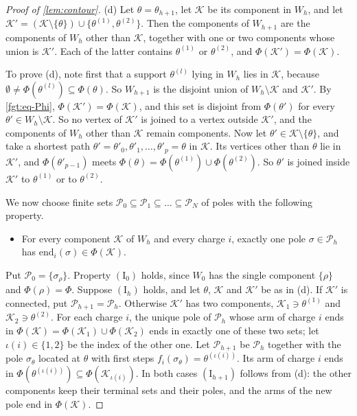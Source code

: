 \begin{proof}[Proof of \cref{lem:contour}]
(d) Let $\theta=\theta_{h+1}$, let $\mathcal K$ be its component in $W_h$, and let $\mathcal K'=(\mathcal K\setminus\{\theta\})\cup\{\theta^{(1)},\theta^{(2)}\}$. Then the components of $W_{h+1}$ are the components of $W_h$ other than $\mathcal K$, together with one or two components whose union is $\mathcal K'$. Each of the latter contains $\theta^{(1)}$ or $\theta^{(2)}$, and $\Phi(\mathcal K')=\Phi(\mathcal K)$.

To prove (d), note first that a support $\theta^{(l)}$ lying in $W_h$ lies in $\mathcal K$, because $\emptyset\ne\Phi(\theta^{(l)})\subseteq\Phi(\theta)$. So $W_{h+1}$ is the disjoint union of $W_h\setminus\mathcal K$ and $\mathcal K'$. By \eqref{fgt:eq-Phi}, $\Phi(\mathcal K')=\Phi(\mathcal K)$, and this set is disjoint from $\Phi(\theta')$ for every $\theta'\in W_h\setminus\mathcal K$. So no vertex of $\mathcal K'$ is joined to a vertex outside $\mathcal K'$, and the components of $W_h$ other than $\mathcal K$ remain components. Now let $\theta'\in\mathcal K\setminus\{\theta\}$, and take a shortest path $\theta'=\theta'_0,\theta'_1,\dots,\theta'_p=\theta$ in $\mathcal K$. Its vertices other than $\theta$ lie in $\mathcal K'$, and $\Phi(\theta'_{p-1})$ meets $\Phi(\theta)=\Phi(\theta^{(1)})\cup\Phi(\theta^{(2)})$. So $\theta'$ is joined inside $\mathcal K'$ to $\theta^{(1)}$ or to $\theta^{(2)}$.

We now choose finite sets $\mathcal P_0\subseteq\mathcal P_1\subseteq\dots\subseteq\mathcal P_N$ of poles with the following property.
\begin{itemize}
\item[$(\mathrm I_h)$] For every component $\mathcal K$ of $W_h$ and every charge $i$, exactly one pole $\sigma\in\mathcal P_h$ has $\mathrm{end}_i(\sigma)\in\Phi(\mathcal K)$.
\end{itemize}
Put $\mathcal P_0=\{\sigma_\rho\}$. Property $(\mathrm I_0)$ holds, since $W_0$ has the single component $\{\rho\}$ and $\Phi(\rho)=\Phi$. Suppose $(\mathrm I_h)$ holds, and let $\theta$, $\mathcal K$ and $\mathcal K'$ be as in (d). If $\mathcal K'$ is connected, put $\mathcal P_{h+1}=\mathcal P_h$. Otherwise $\mathcal K'$ has two components, $\mathcal K_1\ni\theta^{(1)}$ and $\mathcal K_2\ni\theta^{(2)}$. For each charge $i$, the unique pole of $\mathcal P_h$ whose arm of charge $i$ ends in $\Phi(\mathcal K)=\Phi(\mathcal K_1)\cup\Phi(\mathcal K_2)$ ends in exactly one of these two sets; let $\iota(i)\in\{1,2\}$ be the index of the other one. Let $\mathcal P_{h+1}$ be $\mathcal P_h$ together with the pole $\sigma_\theta$ located at $\theta$ with first steps $f_i(\sigma_\theta)=\theta^{(\iota(i))}$. Its arm of charge $i$ ends in $\Phi(\theta^{(\iota(i))})\subseteq\Phi(\mathcal K_{\iota(i)})$. In both cases $(\mathrm I_{h+1})$ follows from (d): the other components keep their terminal sets and their poles, and the arms of the new pole end in $\Phi(\mathcal K)$.


\end{proof}
